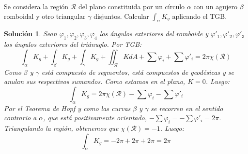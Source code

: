 \documentclass[twoside]{report}
\theoremstyle{plain}
\newtheorem*{sol*}{Solución}
\newcommand{\X}{\chi}
\newenvironment{ejercicio}[2][Estado]{\begin{trivlist}
\item[\hskip \labelsep {\bfseries Ejercicio}\hskip \labelsep {\bfseries #2.}]}{\end{trivlist}}
\begin{document}
\newpage
\begin{ejercicio}{20}
Se considera la región $\mathcal{R}$ del plano constituida por un círculo $\alpha$ con un agujero $\beta$ romboidal y otro triangular $\gamma$ disjuntos. Calcular $\int_\alpha K_g$ aplicando el TGB.
\end{ejercicio}
\begin{sol*} Sean $\varphi_1,\varphi_2,\varphi_3,\varphi_4$ los ángulos exteriores del romboide y  $\varphi'_1,\varphi'_2,\varphi'_3$ los ángulos exteriores del triánuglo. Por TGB:
\[ \int_\alpha K_g + \int_\beta K_g + \int_\gamma K_g + \iint_\mathcal{R} K dA + \sum \varphi_i + \sum \varphi'_i = 2 \pi \X(\mathcal{R}) \]
Como $\beta$ y $\gamma$ está compuesto de segmentos, está compuestos de geodésicas y se anulan sus respectivos sumandos. Como estamos en el plano, $K = 0$. Luego:
\[ \int_\alpha K_g = 2 \pi \X(\mathcal{R}) - \sum \varphi_i - \sum \varphi'_i \]
Por el Teorema de Hopf y como las curvas $\beta$ y $\gamma$ se recorren en el sentido contrario a $\alpha$, que está positivamente orientado, $-\sum \varphi_i = -\sum \varphi'_i = 2\pi$. Triangulando la región, obtenemos que $\X(\mathcal{R})=-1$. Luego:
\[ \int_\alpha K_g = -2\pi+2\pi+2\pi = 2\pi \]
\end{sol*}
\end{document}
